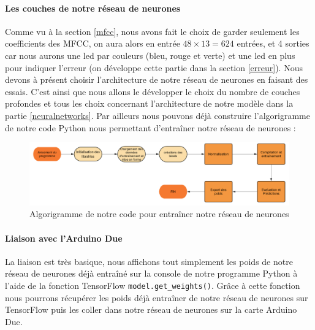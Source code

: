 \documentclass[a4paper,11pt]{article}
\begin{document}
\paragraph{Les couches de notre réseau de neurones}
Comme vu à la section \ref{mfcc}, nous avons fait le choix de garder seulement les coefficients des MFCC, on aura alors en entrée $48 \times 13 = 624$ entrées, et 4 sorties car nous aurons une led par couleurs (bleu, rouge et verte) et une led en plus pour indiquer l'erreur (on développe cette partie dans la section \ref{erreur}). Nous devons à présent choisir l'architecture de notre réseau de neurones en faisant des essais. C'est ainsi que nous allons le développer le choix du nombre de couches profondes et tous les choix concernant l'architecture de notre modèle dans la partie \ref{neuralnetworks}. Par ailleurs nous pouvons déjà construire l'algorigramme de notre code Python nous permettant d'entraîner notre réseau de neurones : 
\begin{figure}[H]
\begin{center}
\includegraphics[scale=0.35]{images/algo_cnn.png}
\caption{Algorigramme de notre code pour entraîner notre réseau de neurones} \label{fig:algo_cnn}
\end{center}
\end{figure}

\paragraph{Liaison avec l'Arduino Due}
La liaison est très basique, nous affichons tout simplement les poids de notre réseau de neurones déjà entraîné sur la console de notre programme Python à l'aide de la fonction TensorFlow \texttt{model.get\_weights()}. Grâce à cette fonction nous pourrons récupérer les poids déjà entraîner de notre réseau de neurones sur TensorFlow puis les coller dans notre réseau de neurones sur la carte Arduino Due.
\end{document}
